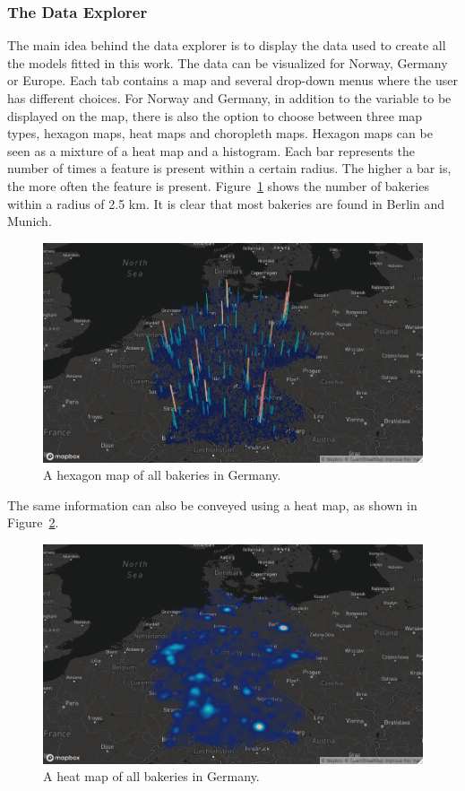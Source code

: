 \subsubsection*{The Data Explorer}
The main idea behind the data explorer is to display the data used to create all the models fitted in this work. The data can be visualized for Norway, Germany or Europe. Each tab contains a map and several drop-down menus where the user has different choices. For Norway and Germany, in addition to the variable to be displayed on the map, there is also the option to choose between three map types, hexagon maps, heat maps and choropleth maps. Hexagon maps can be seen as a mixture of a heat map and a histogram. Each bar represents the number of times a feature is present within a certain radius. The higher a bar is, the more often the feature is present. Figure~\ref{fig:map_1} shows the number of bakeries within a radius of 2.5 km. It is clear that most bakeries are found in Berlin and Munich.
\begin{figure}[H]
    \centering
    \includegraphics[width = \textwidth]{bakeries_germany_hex.png}
    \caption{A hexagon map of all bakeries in Germany.}
    \label{fig:map_1}
\end{figure}
\clearpage
The same information can also be conveyed using a heat map, as shown in Figure~\ref{fig:map_2}. 
\begin{figure}[H]
    \centering
    \includegraphics[width = \textwidth]{bakeries_germany_heat.png}
    \caption{A heat map of all bakeries in Germany.}
    \label{fig:map_2}
\end{figure}
